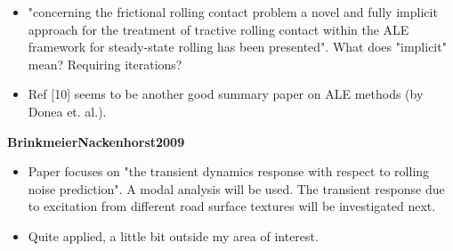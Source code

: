 \documentclass{article}
\begin{document}
\begin{itemize}
\item "concerning the frictional rolling contact problem a novel and fully implicit approach for the treatment of tractive rolling contact within the ALE framework for steady-state rolling has been presented". What does "implicit" mean? Requiring iterations?
\item Ref [10] seems to be another good summary paper on ALE methods (by Donea et. al.).
\end{itemize}

\textbf{BrinkmeierNackenhorst2009}
\begin{itemize}
\item Paper focuses on "the transient dynamics response with respect to rolling noise prediction". A modal analysis will be used. The transient response due to excitation from different road surface textures will be investigated next.
\item Quite applied, a little bit outside my area of interest.
\end{itemize}
\end{document}
